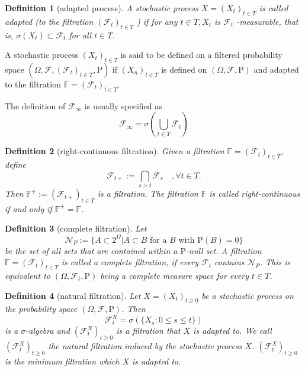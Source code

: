 \documentclass{article}
\newtheorem{definition}{Definition}[section]
\theoremstyle{nonumberplain}
\begin{document}
\begin{definition}[adapted process]
	A stochastic process $X=(X_{t})_{t \in T}$ is called \emph{adapted} (to the filtration $(\mathcal{F}_{t})_{t\in T}$ ) if for any $t \in T, X_{t}$ is $\mathcal{F}_{t}$ -measurable, that is, $\sigma(X_t)\subset \mathcal{F}_t$ for all $t\in T$.
\end{definition}

A stochastic process $(X_{t})_{t\in T }$ is said to be defined on a filtered probability space $(\Omega,\mathcal{F},(\mathcal{F}_{t})_{t\in T },\mathrm{P})$ if $(X_{n})_{t\in T }$ is defined on $(\Omega,\mathcal{F},\mathrm{P})$ and adapted to the filtration $\mathbb{F} =(\mathcal{F}_{t})_{t\in T }$. 

The definition of $\mathcal{F}_{\infty}$ is usually specified as
\[
\mathcal{F}_{\infty}=\sigma\left(\bigcup_{t\in T} \mathcal{F}_t\right)
\]

\begin{definition}[right-continuous filtration]
Given a filtration $\mathbb{F}=(\mathcal{F}_{t})_{t\in T}$, define
\[
\mathcal{F}_{t+}:=\bigcap_{s>t}\mathcal{F}_{s}\quad,\forall t\in T.
\]
Then $\mathbb{F}^+:=({\mathcal{F}}_{t+})_{t\in T}$ is a filtration. The filtration $\mathbb {F}$ is called \emph{right-continuous} if and only if $\mathbb{F}^{+}=\mathbb {F}$.
\end{definition}

\begin{definition}[complete filtration]
Let
\[\mathcal{N}_{P}:=\{A\subset 2^\Omega | A\subset B\text{ for a }B\text{ with }\mathrm{P}(B)=0\}
\]
be the set of all sets that are contained within a $\mathrm{P}$-null set. A filtration $\mathbb{F} =(\mathcal{F}_{t})_{t\in T}$ is called a \emph{complete filtration}, if every $\mathcal{F}_{t}$ contains $\mathcal{N}_{P}$. This is equivalent to $(\Omega,\mathcal{F}_{t},\mathrm{P})$ being a complete measure space for every $t\in T$.
\end{definition}

\begin{definition}[natural filtration]
	Let $X=(X_{t})_{t\ge 0}$ be a stochastic process on the probability space $(\Omega,\mathcal{F},\mathrm{P})$. Then 
	\[
	{\mathcal {F}}_{t}^X=\sigma (\{X_{s}:0\le s\le t\})
	\]
	is a $\sigma$-algebra and $(\mathcal {F}_{t}^X)_{t\ge0} $ is a filtration that $X$ is adapted to. We call $(\mathcal {F}_{t}^X)_{t\ge0} $ the \emph{natural filtration} induced by the stochastic process $X$. $(\mathcal {F}_{t}^X)_{t\ge0} $ is the minimum filtration which $X$ is adapted to.
\end{definition}
\end{document}
